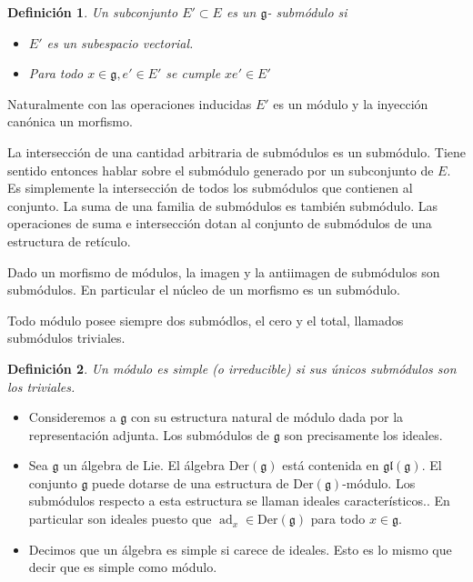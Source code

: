 \documentclass[a4paper,draft,12pt]{article}
\newtheorem{defi}{Definición}[section]%
\newcommand{\g}{\mathfrak{g}}%
\newcommand{\df}[1]{\textsf{\color{blue}#1}}
\DeclareMathOperator{\ad}{ad}  %
\begin{document}
\begin{defi}

Un subconjunto $E' \subset E$ es un $\g$- \df{submódulo}  si

\begin{itemize}

\item $E'$ es un subespacio vectorial.

\item Para todo $x \in \g, e' \in E'$ se cumple $xe'\in E'$

\end{itemize}

\end{defi}

Naturalmente con las operaciones inducidas $E'$ es un módulo y la inyección canónica un morfismo.

La intersección de una cantidad arbitraria de submódulos es  un submódulo.  Tiene sentido entonces hablar sobre el submódulo generado por un subconjunto de $E$.  Es simplemente la intersección de todos los submódulos que contienen al conjunto.  La suma de una familia de submódulos es también submódulo.  Las operaciones de suma e intersección dotan al conjunto de submódulos de una estructura de retículo.

Dado un morfismo de módulos, la imagen y la antiimagen de submódulos son submódulos.  En particular el núcleo de un morfismo es un submódulo.

Todo módulo posee siempre dos submódlos, el cero y el total, llamados submódulos triviales.

\begin{defi}

Un módulo es  \df{simple}  (o  \df{irreducible}) si sus únicos submódulos son los triviales.

\end{defi}

  

\begin{itemize}

\item Consideremos a $\g$ con su estructura natural de módulo dada por la representación adjunta. Los submódulos de $\g$ son precisamente los ideales.

\item Sea $\g$ un álgebra de Lie.  El álgebra $\mathrm{Der}(\g)$ está contenida en $\mathfrak{gl}(\g)$.  El conjunto $\g$ puede dotarse de una estructura de $\mathrm{Der}(\g)$-módulo.  Los submódulos respecto a esta estructura se llaman   \df{ideales característicos}..  En particular son ideales puesto que $\ad_x \in \mathrm{Der}(\g)$ para todo $x \in \g$.

\item  Decimos que un álgebra es simple si carece de ideales. Esto es lo mismo que decir que es simple como módulo.

\end{itemize}
\end{document}
